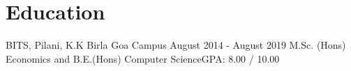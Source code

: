 \section{Education}\label{sec:education}
\resumeSubHeadingListStart

\resumeSubheading
{BITS, Pilani, K.K Birla Goa Campus} {August 2014 - August 2019}
{M.Sc. (Hons) Economics and B.E.(Hons) Computer Science}{GPA: 8.00 / 10.00}

\resumeSubHeadingListEnd